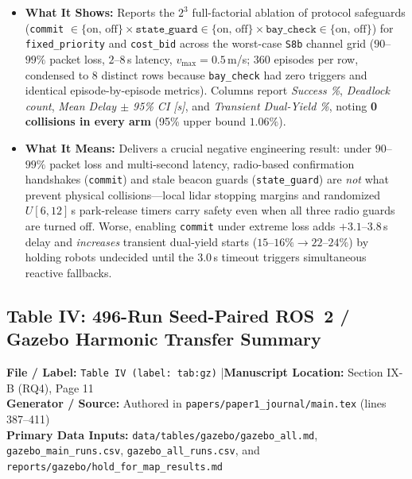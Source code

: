 \documentclass[10pt,a4paper]{article}
\newcommand{\meta}[4]{%
  \vspace{2pt}%
  \noindent\colorbox{BoxBg}{%
    \parbox{\dimexpr\textwidth-2\fboxsep\relax}{%
      \footnotesize\raggedright
      \textbf{File / Label:} \texttt{#1} \quad|\quad \textbf{Manuscript Location:} #2\\[1pt]
      \textbf{Generator / Source:} #3\\[1pt]
      \textbf{Primary Data Inputs:} #4%
    }%
  }\par\vspace{4pt}%
}
\begin{document}
\begin{itemize}
  \item \textbf{What It Shows:} Reports the $2^3$ full-factorial ablation of protocol safeguards (\texttt{commit} $\in\{\text{on, off}\} \times \texttt{state\_guard} \in\{\text{on, off}\} \times \texttt{bay\_check} \in\{\text{on, off}\}$) for \texttt{fixed\_priority} and \texttt{cost\_bid} across the worst-case \texttt{S8b} channel grid ($90$--$99\%$ packet loss, $2$--$8$\,s latency, $v_{\max}=0.5$\,m/s; 360 episodes per row, condensed to 8 distinct rows because \texttt{bay\_check} had zero triggers and identical episode-by-episode metrics). Columns report \emph{Success \%}, \emph{Deadlock count}, \emph{Mean Delay $\pm$ 95\% CI [s]}, and \emph{Transient Dual-Yield \%}, noting \textbf{0 collisions in every arm} (95\% upper bound $1.06\%$).
  \item \textbf{What It Means:} Delivers a crucial negative engineering result: under $90$--$99\%$ packet loss and multi-second latency, radio-based confirmation handshakes (\texttt{commit}) and stale beacon guards (\texttt{state\_guard}) are \emph{not} what prevent physical collisions---local lidar stopping margins and randomized $U[6,12]$\,s park-release timers carry safety even when all three radio guards are turned off. Worse, enabling \texttt{commit} under extreme loss adds $+3.1$--$3.8$\,s delay and \emph{increases} transient dual-yield starts ($15$--$16\% \to 22$--$24\%$) by holding robots undecided until the $3.0$\,s timeout triggers simultaneous reactive fallbacks.
\end{itemize}

\clearpage
\subsection{Table IV: 496-Run Seed-Paired ROS~2 / Gazebo Harmonic Transfer Summary}

\meta{Table IV (label: tab:gz)}{Section IX-B (RQ4), Page 11}{Authored in \texttt{papers/paper1\_journal/main.tex} (lines 387--411)}{\texttt{data/tables/gazebo/gazebo\_all.md}, \texttt{gazebo\_main\_runs.csv}, \texttt{gazebo\_all\_runs.csv}, and \texttt{reports/gazebo/hold\_for\_map\_results.md}}
\end{document}
